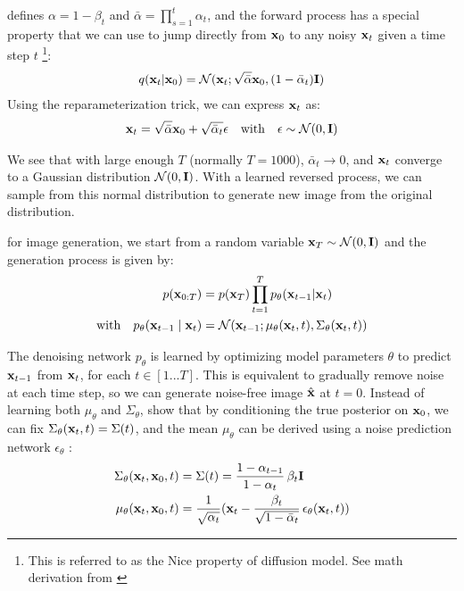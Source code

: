 \cite{hoDDPM} defines $\alpha = 1 - \beta_t$ and $\bar\alpha = \prod_{s=1}^{t} \alpha_t$, and the forward process has a special property that we can use to jump directly from ${\mathbf{x}}_0$ to any noisy ${\mathbf{x}}_t$ given a time step $t$ \footnote{This is referred to as the Nice property of diffusion model. See math derivation from \cite{soto2024ddpmLecture}}:
\begin{align}
 q({\mathbf{x}}_t | {\mathbf{x}}_0) = {\mathcal{N}}({\mathbf{x}}_t; \sqrt{\bar\alpha}{\mathbf{x}}_0, (1 - \bar\alpha_t) {\mathbf{I}}) \label{eq:q-xt} 
\end{align}
Using the reparameterization trick, we can express ${\mathbf{x}}_t$ as: 
\begin{align}
    {\mathbf{x}}_t = \sqrt{\bar\alpha} {\mathbf{x}}_0 + \sqrt{\bar\alpha_t} \epsilon \quad \mathrm{with} \quad \epsilon \sim {\mathcal{N}}(0, {\mathbf{I}}) \label{eq:xt-from-x0}
\end{align}

We see that with large enough $T$ (normally $T=1000$), $\bar\alpha_t \to 0$, and ${\mathbf{x}}_t$ converge to a Gaussian distribution ${\mathcal{N}}(0, {\mathbf{I}})$. With a learned reversed process, we can sample from this normal distribution to generate new image from the original distribution. 

 for image generation, we start from a random variable ${\mathbf{x}}_T \sim {\mathcal{N}}(0, {\mathbf{I}})$ and the generation process is given by: 
\begin{align}
    p({\mathbf{x}}_{0:T}) &= p({\mathbf{x}}_T) \prod_{t=1}^T{p_{\theta}({\mathbf{x}}_{t-1} | {\mathbf{x}}_t)} \\
    \mathrm{with} \quad p_{\theta}({\mathbf{x}}_{t-1} \mid {\mathbf{x}}_t) &= {\mathcal{N}} ({\mathbf{x}}_{t-1}; \mu_{\theta}({\mathbf{x}}_t, t), \Sigma_{\theta} ({\mathbf{x}}_t, t)) \label{eq:ddpm-sample}
\end{align}

The denoising network $p_{\theta}$ is learned by optimizing model parameters $\theta$ to predict ${\mathbf{x}}_{t-1}$ from ${\mathbf{x}}_t$, for each $t \in [1 ... T]$. This is equivalent to gradually remove noise at each time step, so we can generate noise-free image $\hat{{\mathbf{x}}}$ at $t = 0$. Instead of learning both $\mu_{\theta}$ and $\Sigma_{\theta}$, \cite{hoDDPM} show that by conditioning the true posterior on ${\mathbf{x}}_0$, we can fix $\Sigma_\theta({\mathbf{x}}_t, t) = \Sigma(t)$, and the mean $\mu_\theta$ can be derived using a noise prediction network $\epsilon_{\theta}$ \cite{soto2024ddpmLecture}: 
\begin{align}
    \Sigma_\theta({\mathbf{x}}_t, {\mathbf{x}}_0, t) &= \Sigma(t) = \frac{1 - \alpha_{t-1}}{1 - \alpha_t} \, \beta_t \mathbf{I} \\
    \mu_{\theta} ({\mathbf{x}}_t, {\mathbf{x}}_0, t) &= \frac{1}{\sqrt{\alpha_t}} ( {\mathbf{x}}_t -\frac{\beta_t}{\sqrt{1 - \bar{\alpha}_t}} \, \epsilon_{\theta} ({\mathbf{x}}_t, t)) \label{eq:epsilon}
\end{align}

